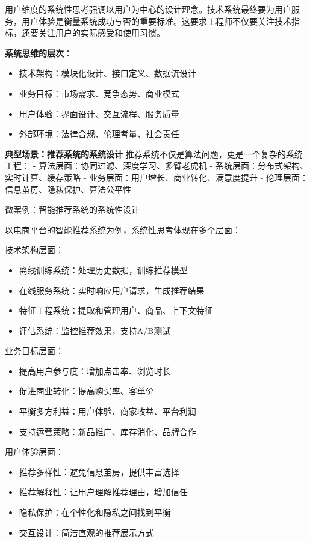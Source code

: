 用户维度的系统性思考强调以用户为中心的设计理念。技术系统最终要为用户服务，用户体验是衡量系统成功与否的重要标准。这要求工程师不仅要关注技术指标，还要关注用户的实际感受和使用习惯。

 \textbf{系统思维的层次}：
 \begin{itemize}
 \item 技术架构：模块化设计、接口定义、数据流设计
 \item 业务目标：市场需求、竞争态势、商业模式
 \item 用户体验：界面设计、交互流程、服务质量
 \item 外部环境：法律合规、伦理考量、社会责任
 \end{itemize}

\textbf{典型场景：推荐系统的系统设计}
推荐系统不仅是算法问题，更是一个复杂的系统工程：
- 算法层面：协同过滤、深度学习、多臂老虎机
- 系统层面：分布式架构、实时计算、缓存策略
- 业务层面：用户增长、商业转化、满意度提升
- 伦理层面：信息茧房、隐私保护、算法公平性

微案例：智能推荐系统的系统性设计

以电商平台的智能推荐系统为例，系统性思考体现在多个层面：

技术架构层面：
\begin{itemize}
\item 离线训练系统：处理历史数据，训练推荐模型
\item 在线服务系统：实时响应用户请求，生成推荐结果
\item 特征工程系统：提取和管理用户、商品、上下文特征
\item 评估系统：监控推荐效果，支持A/B测试
\end{itemize}

业务目标层面：
\begin{itemize}
\item 提高用户参与度：增加点击率、浏览时长
\item 促进商业转化：提高购买率、客单价
\item 平衡多方利益：用户体验、商家收益、平台利润
\item 支持运营策略：新品推广、库存消化、品牌合作
\end{itemize}

用户体验层面：
\begin{itemize}
\item 推荐多样性：避免信息茧房，提供丰富选择
\item 推荐解释性：让用户理解推荐理由，增加信任
\item 隐私保护：在个性化和隐私之间找到平衡
\item 交互设计：简洁直观的推荐展示方式
\end{itemize}

